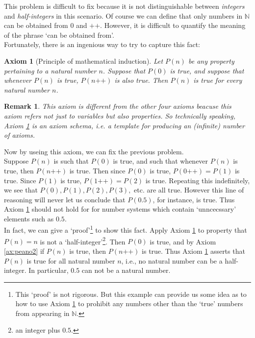 \documentclass[a4paper]{book}
\theoremstyle{break}
\newtheorem{axiom}{Axiom}[chapter]
\newtheorem{remark}{Remark}[section]
\begin{document}
			This problem is difficult to fix because it is not distinguishable between \textit{integers} and \textit{half-integers} in this scenario. Of course we can define that only numbers in $\mathbb{N}$ can be obtained from $0$ and $\texttt{++}$. However, it is difficult to quantify the meaning of the phrase `can be obtained from'.\\
			Fortunately, there is an ingenious way to try to capture this fact:
			\begin{axiom}[Principle of mathematical induction]
				\label{ax:peano5}
				Let $P(n)$ be any property pertaining to a natural number $n$. Suppose that $P(0)$ is true, and suppose that whenever $P(n)$ is true, $P(n\texttt{++})$ is also true. Then $P(n)$ is true for every natural number $n$.
      \end{axiom}
			\begin{remark}
				This axiom is different from the other four axioms beacuse this axiom refers not just to \textit{variables} but also \textit{properties}. So technically speaking, Axiom \ref{ax:peano5} is an \textit{axiom schema}, i.e. a template for producing an (infinite) number of axioms.
			\end{remark}
			Now by useing this axiom, we can fix the previous problem.\\
			Suppose $P(n)$ is such that $P(0)$ is true, and such that whenever $P(n)$ is true, then $P(n \texttt{++})$ is true. Then since $P(0)$ is true, $P(0 \texttt{++}) = P(1)$ is true. Since $P(1)$ is true, $P(1 \texttt{++}) = P(2)$ is true. Repeating this indefinitely, we see that $P(0), P(1), P(2), P(3),$ etc. are all true. However this line of reasoning will never let us conclude that $P(0.5)$, for instance, is true. Thus Axiom \ref{ax:peano5} should not hold for for number systems which contain `unncecssary' elements such as $0.5$.\\
			In fact, we can give a `proof'\footnote{This `proof' is not rigorous. But this example can provide us some idea as to how to use Axiom \ref{ax:peano5} to prohibit any numbers other than the `true' numbers from appearing in $\mathbb{N}$.} to show this fact. Apply Axiom \ref{ax:peano5} to property that $P(n)= n$ is not a `half-integer'\footnote{an integer plus $0.5$.}. Then $P(0)$ is true, and by Axiom \ref{ax:peano2} if $P(n)$ is true, then $P(n\texttt{++})$ is true. Thus Axiom \ref{ax:peano5} asserts that $P(n)$ is true for all natural number $n$, i.e., no natural number can be a half-integer. In particular, $0.5$ can not be a natural number.\\
\end{document}
